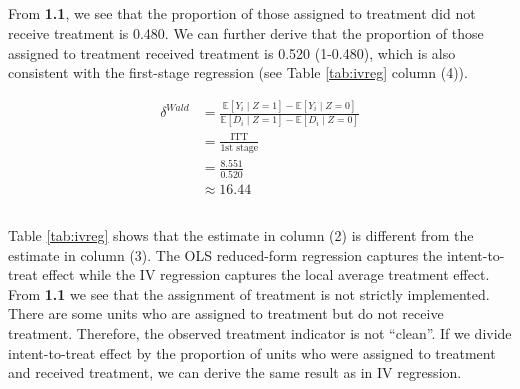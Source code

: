 \documentclass[a4paper]{article}
\begin{document}

\subsection{} %

From \textbf{1.1}, we see that the proportion of those assigned to treatment did not receive treatment is 0.480. We can further derive that the proportion of those assigned to treatment received treatment is 0.520 (1-0.480), which is also consistent with the first-stage regression (see Table \ref{tab:ivreg} column (4)).

\begin{align*}
    \delta^{Wald}&=\frac{\mathbb{E}[Y_i\mid Z=1] - \mathbb{E}[Y_i\mid Z=0]}
    {\mathbb{E}[D_i\mid Z=1] - \mathbb{E}[D_i\mid Z=0]} \\
    &=\frac{\textrm{ITT}}{\textrm{1st stage}} \\
    &=\frac{8.551}{0.520} \\
    &\approx16.44
\end{align*}

\subsection{}

Table \ref{tab:ivreg} shows that the estimate in column (2) is different from the estimate in column (3). The OLS reduced-form regression captures the intent-to-treat effect while the IV regression captures the local average treatment effect. From \textbf{1.1} we see that the assignment of treatment is not strictly implemented. There are some units who are assigned to treatment but do not receive treatment. Therefore, the observed treatment indicator is not ``clean''.  If we divide intent-to-treat effect by the proportion of units who were assigned to treatment and received treatment, we can derive the same result as in IV regression.

\end{document}
